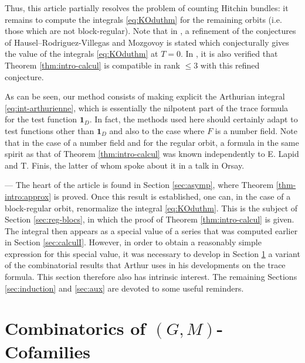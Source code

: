 
\begin{paragr}
Thus, this article partially resolves the problem of counting Hitchin bundles: it remains to compute the integrals \eqref{eq:KOduthm} for the remaining orbits (i.e. those which are not block-regular). Note that in \cite{scfh}, a refinement of the conjectures of Hausel--Rodriguez-Villegas and Mozgovoy is stated which conjecturally gives the value of the integrals \eqref{eq:KOduthm} at $T=0$. In \cite{scfh}, it is also verified that Theorem \ref{thm:intro-calcul} is compatible in rank $\leq 3$ with this refined conjecture.

As can be seen, our method consists of making explicit the Arthurian integral \eqref{eq:int-arthurienne}, which is essentially the nilpotent part of the trace formula for the test function $\mathbf{1}_D$. In fact, the methods used here should certainly adapt to test functions other than $\mathbf{1}_D$ and also to the case where $F$ is a number field. Note that in the case of a number field and for the regular orbit, a formula in the same spirit as that of Theorem \ref{thm:intro-calcul} was known independently to E. Lapid and T. Finis, the latter of whom spoke about it in a talk in Orsay.
\end{paragr}

\begin{paragr} --- The heart of the article is found in Section \ref{sec:asymp}, where Theorem \ref{thm-intro:approx} is proved. Once this result is established, one can, in the case of a block-regular orbit, \og renormalize\fg{} the integral \eqref{eq:KOduthm}. This is the subject of Section \ref{sec:reg-blocs}, in which the proof of Theorem \ref{thm:intro-calcul} is given. The integral then appears as a special value of a series that was computed earlier in Section \ref{sec:calculI}. However, in order to obtain a reasonably simple expression for this special value, it was necessary to develop in Section \ref{sec:combi} a variant of the combinatorial results that Arthur uses in his developments on the trace formula. This section therefore also has intrinsic interest. The remaining Sections \ref{sec:induction} and \ref{sec:aux} are devoted to some useful reminders.
\end{paragr}


\section{\texorpdfstring{Combinatorics of $(G,M)$-Cofamilies}{Combinatorics of (G,M)-Cofamilies}}\label{sec:combi}

